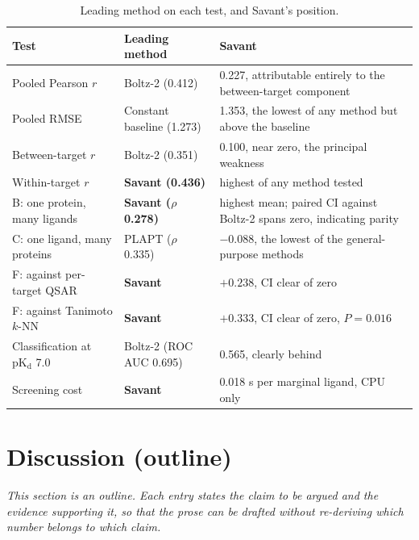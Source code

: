 \documentclass[11pt]{article}
\newcommand{\pkd}{\ensuremath{\mathrm{pK_d}}}
\begin{document}
\begin{table}[H]
\centering
\caption{Leading method on each test, and Savant's position.}
\label{tab:summary}
\small
\begin{tabular}{p{}p{}p{}}
\toprule
Test & Leading method & Savant \\
\midrule
Pooled Pearson $r$ & Boltz-2 (0.412) & 0.227, attributable entirely to the between-target component \\
Pooled RMSE & Constant baseline (1.273) & 1.353, the lowest of any method but above the baseline \\
Between-target $r$ & Boltz-2 (0.351) & 0.100, near zero, the principal weakness \\
Within-target $r$ & \textbf{Savant (0.436)} & highest of any method tested \\
B: one protein, many ligands & \textbf{Savant ($\rho$ 0.278)} & highest mean; paired CI against Boltz-2 spans zero, indicating parity \\
C: one ligand, many proteins & PLAPT ($\rho$ 0.335) & $-0.088$, the lowest of the general-purpose methods \\
F: against per-target QSAR & \textbf{Savant} & $+0.238$, CI clear of zero \\
F: against Tanimoto $k$-NN & \textbf{Savant} & $+0.333$, CI clear of zero, $P = 0.016$ \\
Classification at \pkd{} 7.0 & Boltz-2 (ROC AUC 0.695) & 0.565, clearly behind \\
Screening cost & \textbf{Savant} & 0.018 s per marginal ligand, CPU only \\
\bottomrule
\end{tabular}
\end{table}

\section{Discussion (outline)}

\noindent
\textit{This section is an outline. Each entry states the claim to be argued
and the evidence supporting it, so that the prose can be drafted without
re-deriving which number belongs to which claim.}
\end{document}

